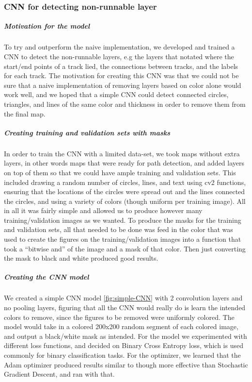 \documentclass[a4paper,12pt]{extarticle}
\begin{document}
\subsubsection{CNN for detecting non-runnable layer}
\subparagraph{Motivation for the model\\}

To try and outperform the naive implementation, we developed and trained a CNN to detect the non-runnable layers, e.g the layers that notated where the start/end points of a track lied, the connections between tracks, and the labels for each track.
The motivation for creating this CNN was that we could not be sure that a naive implementation of removing layers based on color alone would work well, and we hoped that a simple CNN could detect connected circles, triangles, and lines of the same color and thickness in order to remove them from the final map. 

\subparagraph{Creating training and validation sets with masks\\}

In order to train the CNN with a limited data-set, we took maps without extra layers, in other words maps that were ready for path detection, and added layers on top of them so that we could have ample training and validation sets. This included drawing a random number of circles, lines, and text using cv2 functions, ensuring that the locations of the circles were spread out and the lines connected the circles, and using a variety of colors (though uniform per training image). All in all it was fairly simple and allowed us to produce however many training/validation images as we wanted. To produce the masks for the training and validation sets, all that needed to be done was feed in the color that was used to create the figures on the training/validation images into a function that took a “bitwise and” of the image and a mask of that color. Then just converting the mask to black and white produced good results.

\subparagraph{Creating the CNN model\\}
We created a simple CNN model \ref{fig:simple-CNN} with 2 convolution layers and no pooling layers, figuring that all the CNN would really do is learn the intended colors to remove, since the figures to be removed were uniformly colored. The model would take in a colored 200x200 random segment of each colored image, and output a black/white mask as intended. For the model we experimented with different loss functions, and decided on Binary Cross Entropy loss, which is used commonly for binary classification tasks. For the optimizer, we learned that the Adam optimizer produced results similar to though more effective than Stochastic Gradient Descent, and ran with that.
\end{document}

